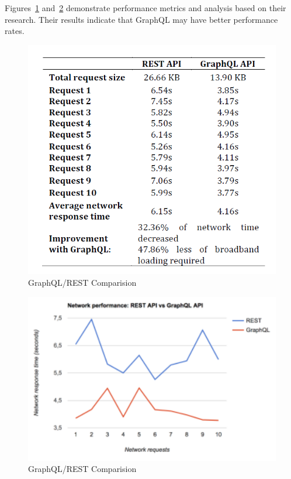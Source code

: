 Figures~\ref{f:comparison-table} 
and~\ref{f:comparison-graph}\cite{hid505Vzquez2017} demonstrate performance 
metrics and analysis based on their research.  Their results indicate that 
GraphQL may have better performance rates.

\begin{figure}[htb]
  \centering\includegraphics[width=\columnwidth]
  {./images/network-response-times-table.png}
  \caption{GraphQL/REST Comparision}\label{f:comparison-table}
\end{figure}

\begin{figure}[htb]
  \centering\includegraphics[width=\columnwidth]
  {./images/network-response-times-graph.png}
  \caption{GraphQL/REST Comparision}\label{f:comparison-graph}
\end{figure}

